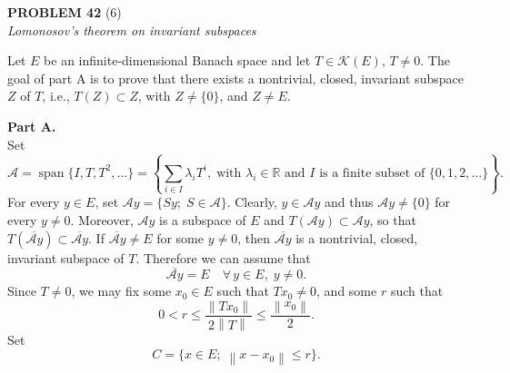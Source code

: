 \documentclass[12pt]{article}
\newcommand{\norm}[1]{\left\|#1\right\|}
\newcommand{\R}{\mathbb{R}}
\begin{document}
\noindent\textbf{PROBLEM 42} (6)\\[4pt]
\textit{Lomonosov's theorem on invariant subspaces}
 
\medskip
 
Let $E$ be an infinite-dimensional Banach space and let $T \in \mathcal{K}(E)$, $T \neq 0$.
The goal of part A is to prove that there exists a nontrivial, closed, invariant subspace $Z$
of $T$, i.e., $T(Z) \subset Z$, with $Z \neq \{0\}$, and $Z \neq E$.
 
\medskip
 
\noindent\textbf{Part A.}\\
Set
\[
\mathcal{A} = \operatorname{span}\{I, T, T^2, \ldots\}
= \left\{\sum_{i \in I} \lambda_i T^i,\;\text{with } \lambda_i \in \R
\text{ and } I \text{ is a finite subset of } \{0,1,2,\ldots\}\right\}.
\]
For every $y \in E$, set $\mathcal{A}y = \{Sy;\; S \in \mathcal{A}\}$. Clearly, $y \in \mathcal{A}y$ and thus
$\mathcal{A}y \neq \{0\}$ for every $y \neq 0$. Moreover, $\mathcal{A}y$ is a subspace of $E$ and
$T(\mathcal{A}y) \subset \mathcal{A}y$, so that $T(\overline{\mathcal{A}y}) \subset \overline{\mathcal{A}y}$. If $\overline{\mathcal{A}y} \neq E$ for some
$y \neq 0$, then $\overline{\mathcal{A}y}$ is a nontrivial, closed, invariant subspace of $T$.
Therefore we can assume that
\begin{equation}\tag{1}
\overline{\mathcal{A}y} = E \quad \forall\, y \in E,\; y \neq 0.
\end{equation}
Since $T \neq 0$, we may fix some $x_0 \in E$ such that $Tx_0 \neq 0$, and some $r$ such that
\[
0 < r \le \frac{\norm{Tx_0}}{2\norm{T}} \le \frac{\norm{x_0}}{2}.
\]
Set
\[
C = \{x \in E;\; \norm{x - x_0} \le r\}.
\]
 
\end{document}

